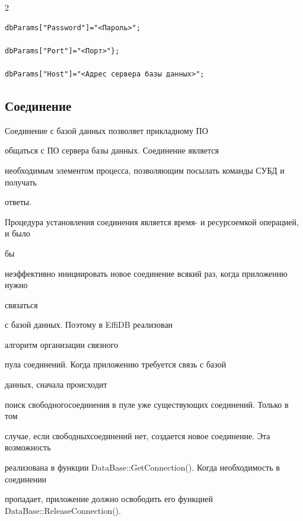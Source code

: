 \begin{multicols}{2}
{\begin{verbatim}
dbParams["Password"]="<Пароль>";

dbParams["Port"]="<Порт>"};

dbParams["Host"]="<Адрес сервера базы данных>";

\end{verbatim}}



\vspace*{-6pt}



\subsection{Соединение} %



Соединение с базой данных позволяет прикладному ПО

общаться с ПО сервера базы данных. Соединение является 

необходимым элементом процесса, позволяющим посылать команды СУБД и получать 

ответы.



Процедура установления соединения является время- и ресурсоемкой операцией, и было 

бы\linebreak

неэффективно инициировать новое соединение всякий раз, когда приложению нужно 

связаться\linebreak

с базой данных. Поэтому в EffiDB реализован\linebreak

алгоритм организации связного 

пула соединений. Когда приложению требуется связь с базой\linebreak

 данных, сначала происходит 

поиск свободного\linebreak соединения в пуле уже существующих соединений. Только в том 

случае, если свободных\linebreak соединений нет, создается новое соединение. Эта возможность 

реализована в функции {\sf DataBase::\linebreak GetConnection()}. Когда необходимость в соединении 

пропадает, приложение должно освободить его функцией {\sf DataBase::ReleaseConnection()}. 


\end{multicols}
